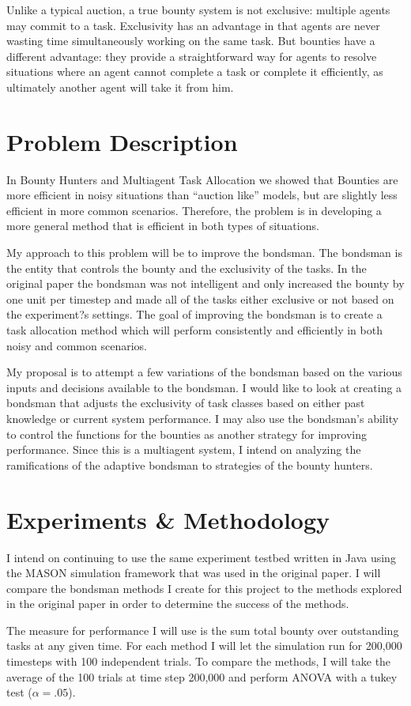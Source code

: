 \documentclass[twocolumn]{article}
\begin{document}
Unlike a typical auction, a true bounty system is not exclusive: multiple agents may commit to a task.  Exclusivity has an advantage in that agents are never wasting time simultaneously working on the same task.  But bounties have a different advantage: they provide a straightforward way for agents to resolve situations where an agent cannot complete a task or complete it efficiently, as ultimately another agent will take it from him. 

\section{Problem Description}
In Bounty Hunters and Multiagent Task Allocation we showed that Bounties are more efficient in noisy situations than ``auction like'' models, but are slightly less efficient in more common scenarios.  Therefore, the problem is in developing a more general method that is efficient in both types of situations.  

My approach to this problem will be to improve the bondsman.  The bondsman is the entity that controls the bounty and the exclusivity of the tasks.  In the original paper the bondsman was not intelligent and only increased the bounty by one unit per timestep and made all of the tasks either exclusive or not based on the experiment?s settings.  The goal of improving the bondsman is to create a task allocation method which will perform consistently and efficiently in both noisy and common scenarios.

My proposal is to attempt a few variations of the bondsman based on the various inputs and decisions available to the bondsman.  I would like to look at creating a bondsman that adjusts the exclusivity of task classes based on either past knowledge or current system performance.  I may also use the bondsman's ability to control the functions for the bounties as another strategy for improving performance.  Since this is a multiagent system, I intend on analyzing the ramifications of the adaptive bondsman to strategies of the bounty hunters.

\section{Experiments \& Methodology}
I intend on continuing to use the same experiment testbed written in Java using the MASON simulation framework that was used in the original paper.  I will compare the bondsman methods I create for this project to the methods explored in the original paper in order to determine the success of the methods.

The measure for performance I will use is the sum total bounty over outstanding tasks at any given time.  For each method I will let the simulation run for 200,000 timesteps with 100 independent trials.  To compare the methods, I will take the average of the 100 trials at time step 200,000 and perform ANOVA with a tukey test (\(\alpha = .05\)).

\vspace{-0.5em}


\end{document}
